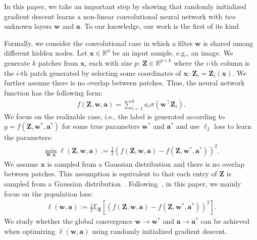 \documentclass{article}
\newcommand{\firstlayer}{w}
\newcommand{\secondlayer}{a}
\def\vw{\mathbf{w}}
\def\va{\mathbf{a}}
\newcommand{\mat}[1]{\mathbf{#1}}
\newcommand{\vect}[1]{\mathbf{#1}}
\newcommand{\expect}{\mathbb{E}}
\begin{document}
In this paper, we take an important step by showing that randomly initialized gradient descent learns a non-linear convolutional neural network with \emph{two} unknown layers $\vw$ and $\va$.
To our knowledge, our work is the first of its kind.

Formally, we consider the convolutional case in which a filter $\vw$ is shared among different hidden nodes. Let $\vect{x} \in \mathbb{R}^{d}$ be an input sample, e.g., an image. We generate $k$ patches from $\vect{x}$, each with size $p$: $\mat Z \in \mathbb{R}^{p \times k}$ where the $i$-th column is the $i$-th patch generated by selecting some coordinates of $\vect{x}$: $\vect{Z}_i = \vect{Z}_i(\vect{x})$.
We further assume there is no overlap between patches.
Thus, the neural network function has the following form:
\begin{align*}
f(\mat{Z},\vect{w},\vect{\secondlayer}) =  \sum_{i=1}^{k} \secondlayer_i\sigma\left(\vect{w}^\top \vect{Z}_i\right).
\end{align*}We focus on the realizable case, i.e., the label is generated according to $y = f\left(\mat{Z},\vect{\firstlayer}^*,\vect{\secondlayer}^*\right)$ for some true parameters $\vect{\firstlayer}^*$ and $\vect{\secondlayer}^*$ and use $\ell_2$ loss to learn the parameters:\begin{align*}
\min_{\vect{w},\vect{\secondlayer}} \ell(\vect{Z},\vect{w},\vect{\secondlayer}) := \frac{1}{2}\left(f\left(\mat{Z},\vect{w},\vect{\secondlayer}\right) - f\left(\mat{Z},\vect{\firstlayer}^*,\vect{\secondlayer}^*\right)\right)^2. \label{eqn:individual_obj}
\end{align*}
We assume $\vect{x}$ is sampled from a Gaussian distribution and there is no overlap between patches.
This assumption is equivalent to that each entry of $\mat{Z}$ is sampled from a Gaussian distribution~\citep{brutzkus2017globally,zhong2017recovery}.
Following~\citep{zhong2017learning,zhong2017recovery,li2017convergence,tian2017analytical,brutzkus2017globally,shalev2017weight},
in this paper, we mainly focus on the population loss:
\begin{align*}
	\ell\left(\vect{w},\vect{\secondlayer}\right) := \frac12\expect_{\mat{Z}}\left[\left(f\left(\mat{Z},\vect{\firstlayer},\vect{\secondlayer}\right)-f\left(\mat{Z},\vect{\firstlayer}^*,\vect{\secondlayer}^*\right)\right)^2\right].
\end{align*}
We study whether the global convergence $\vw\rightarrow\vw^*$ and $\va\rightarrow\va^*$ can be achieved when optimizing $\ell(\vect{w},\vect{a})$ using randomly initialized gradient descent.
\end{document}
